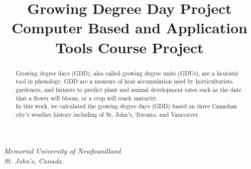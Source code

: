 \documentclass[12pt,letterpaper]{article}
\begin{document}
{\centering
\title{Growing Degree Day Project \\ \vspace{.5 cm} {\Large Computer Based and Application Tools Course Project} }
\maketitle

{\itshape Memorial University of Newfoundland \\ St. John's, Canada.\par}
}
\begin{abstract}
Growing degree days (GDD), also called growing degree units (GDUs), are a heuristic tool in phenology. GDD are a measure of heat accumulation used by horticulturists, gardeners, and farmers to predict plant and animal development rates such as the date that a flower will bloom, or a crop will reach maturity.
\\
In this work, we calculated the growing degree days (GDD) based on three Canadian city's weather history including of St. John's, Toronto, and Vancouver.
\end{abstract}
\end{document}
